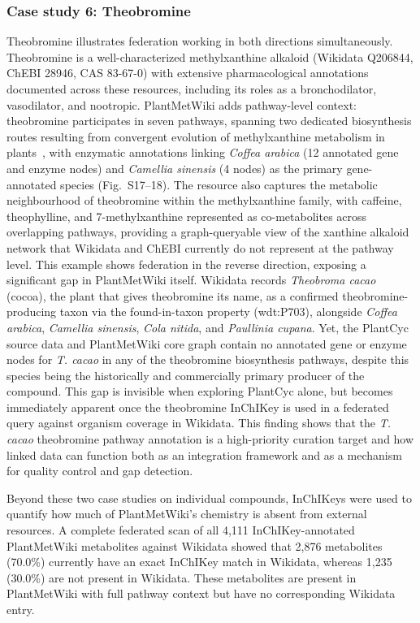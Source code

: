 \documentclass[11pt,a4paper]{article}
\begin{document}
\subsubsection*{Case study 6: Theobromine}
\vspace*{-1em}
Theobromine illustrates federation working in both directions simultaneously. Theobromine is a
well-characterized methylxanthine alkaloid (Wikidata Q206844, ChEBI 28946, CAS 83-67-0) with extensive
pharmacological annotations documented across these resources, including its roles as a
bronchodilator, vasodilator, and nootropic. PlantMetWiki adds pathway-level context: theobromine
participates in seven pathways, spanning two dedicated biosynthesis routes resulting from convergent
evolution of methylxanthine metabolism in plants~\cite{huangr2016}, with enzymatic annotations linking
\textit{Coffea arabica} (12 annotated gene and enzyme nodes) and \textit{Camellia sinensis} (4 nodes)
as the primary gene-annotated species (Fig.~S17--18). The resource also captures the metabolic
neighbourhood of theobromine within the methylxanthine family, with caffeine, theophylline, and
7-methylxanthine represented as co-metabolites across overlapping pathways, providing a
graph-queryable view of the xanthine alkaloid network that Wikidata and ChEBI currently do not
represent at the pathway level. This example shows federation in the reverse direction, exposing a significant gap in
PlantMetWiki itself. Wikidata records \textit{Theobroma cacao} (cocoa), the plant that gives
theobromine its name, as a confirmed theobromine-producing taxon via the found-in-taxon property
(wdt:P703), alongside \textit{Coffea arabica}, \textit{Camellia sinensis}, \textit{Cola nitida}, and
\textit{Paullinia cupana}. Yet, the PlantCyc source data and PlantMetWiki core graph contain no
annotated gene or enzyme nodes for \textit{T. cacao} in any of the theobromine biosynthesis pathways,
despite this species being the historically and commercially primary producer of the compound. This gap is
invisible when exploring PlantCyc alone, but becomes immediately apparent once the theobromine InChIKey
is used in a federated query against organism coverage in Wikidata. This finding shows that the \textit{T. cacao} theobromine pathway
annotation is a high-priority curation target and how linked data can function both as an
integration framework and as a mechanism for quality control and gap detection.

Beyond these two case studies on individual compounds, InChIKeys were used to quantify how much of PlantMetWiki's chemistry is
absent from external resources. A complete federated scan of all 4,111 InChIKey-annotated PlantMetWiki
metabolites against Wikidata showed that 2,876 metabolites (70.0\%) currently have an exact InChIKey
match in Wikidata, whereas 1,235 (30.0\%) are not present in Wikidata. These metabolites are
present in PlantMetWiki with full pathway context but have no corresponding Wikidata entry.
\end{document}

